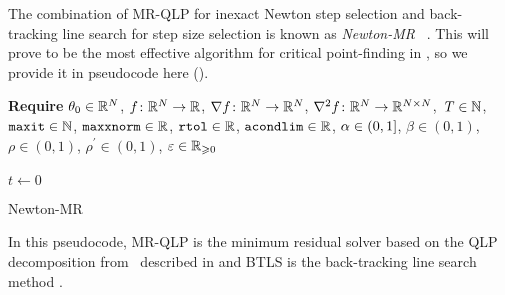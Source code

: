 \documentclass[../../thesis.tex]{subfiles}
\begin{document}
The combination of MR-QLP
for inexact Newton step selection
and back-tracking line search
for step size selection
is known as \emph{Newton-MR}%
~\cite{roosta2018}.
This will prove to be the most effective
algorithm for critical point-finding in
,
so we provide it in pseudocode here
().
\\
\begin{algorithm}[h]
    \SetAlgoLined{}
    \textbf{Require}
    $\theta_0 \in \mathbb{R}^N$,
    $f\colon\mathbb{R}^N\to\mathbb{R}$,
    $\nabla{f}\colon\mathbb{R}^N\to\mathbb{R}^N$,
    $\nabla^2{f}\colon\mathbb{R}^N\to\mathbb{R}^{N\times N}$,\
    $T\in \mathbb{N}$,\\
    $\texttt{maxit} \in \mathbb{N}$,
    $\texttt{maxxnorm} \in \mathbb{R}$,
    $\texttt{rtol} \in \mathbb{R}$,
    $\texttt{acondlim} \in \mathbb{R}$,
    $\alpha \in \intervaloc{0}{1}$,
    $\beta \in (0, 1)$,
    $\rho \in (0, 1)$,
    $\rho^\prime \in (0, 1)$,
    $\varepsilon \in \mathbb{R}_{\geqslant 0}$\\ \ \\
    $t \leftarrow 0$\\
    \caption{Newton-MR}

\end{algorithm}
\noindent In this pseudocode,
MR-QLP is the minimum residual solver
based on the QLP decomposition
from~\cite{choi2011}
described in  and
BTLS is the back-tracking line search method
.
\end{document}
